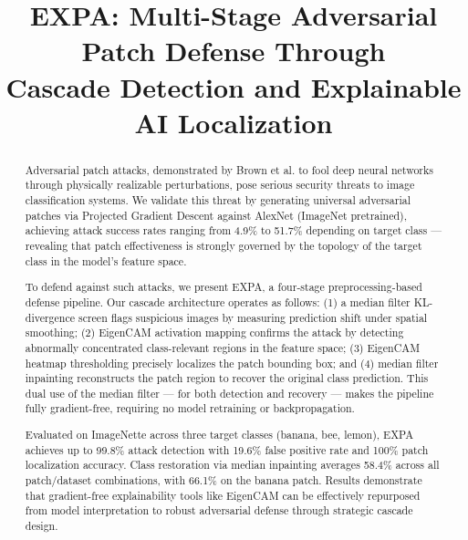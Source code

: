 \documentclass[conference]{IEEEtran}
\begin{document}
\title{EXPA: Multi-Stage Adversarial Patch Defense Through \\
Cascade Detection and Explainable AI Localization}

\author{
}

\maketitle
\begin{abstract}
Adversarial patch attacks, demonstrated by Brown et al. to fool deep
neural networks through physically realizable perturbations, pose
serious security threats to image classification systems. We validate
this threat by generating universal adversarial patches via Projected
Gradient Descent against AlexNet (ImageNet pretrained), achieving
attack success rates ranging from 4.9\% to 51.7\% depending on target
class --- revealing that patch effectiveness is strongly governed by the
topology of the target class in the model's feature space.

To defend against such attacks, we present EXPA, a four-stage
preprocessing-based defense pipeline. Our cascade architecture operates
as follows: (1) a median filter KL-divergence screen flags suspicious
images by measuring prediction shift under spatial smoothing; (2)
EigenCAM activation mapping confirms the attack by detecting abnormally
concentrated class-relevant regions in the feature space; (3) EigenCAM
heatmap thresholding precisely localizes the patch bounding box; and
(4) median filter inpainting reconstructs the patch region to recover
the original class prediction. This dual use of the median filter ---
for both detection and recovery --- makes the pipeline fully
gradient-free, requiring no model retraining or backpropagation.

Evaluated on ImageNette across three target classes (banana, bee, lemon),
EXPA achieves up to 99.8\% attack detection with 19.6\% false positive
rate and 100\% patch localization accuracy. Class restoration via median
inpainting averages 58.4\% across all patch/dataset combinations, with
66.1\% on the banana patch. Results demonstrate that gradient-free
explainability tools like EigenCAM can be effectively repurposed from
model interpretation to robust adversarial defense through strategic
cascade design.
\end{abstract}
\end{document}
